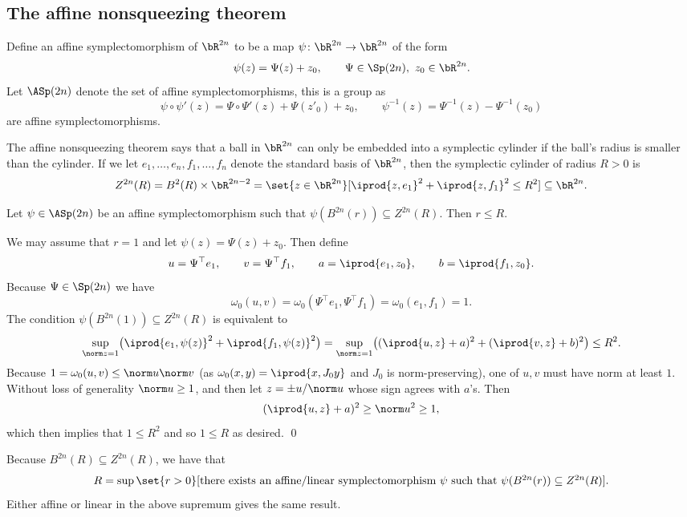 \subsection{The affine nonsqueezing theorem}

Define an {\emphcolor affine symplectomorphism} of $\bR^{2n}$ to be a map $\psi\colon\bR^{2n}\to\bR^{2n}$ of the form
$$ \psi(z) = \Psi(z) + z_0,\qquad \Psi\in\Sp(2n),\ z_0\in\bR^{2n} . $$
Let $\ASp(2n)$ denote the set of affine symplectomorphisms, this is a group as
$$ \psi\circ\psi'(z) = \Psi\circ\Psi'(z) + \Psi(z'_0) + z_0,\qquad \psi^{-1}(z) = \Psi^{-1}(z) - \Psi^{-1}(z_0) $$
are affine symplectomorphisms.

The affine nonsqueezing theorem says that a ball in $\bR^{2n}$ can only be embedded into a symplectic cylinder if the ball's radius is smaller than the cylinder.
If we let $e_1,\dots,e_n,f_1,\dots,f_n$ denote the standard basis of $\bR^{2n}$, then the symplectic cylinder of radius $R>0$ is
$$ Z^{2n}(R) = B^2(R) \times \bR^{2n-2} = \set{z\in\bR^{2n}}[\iprod{z,e_1}^2+\iprod{z,f_1}^2\leq R^2] \subseteq \bR^{2n} . $$

\bthrm[title={The affine nonsqueezing theorem}, name={affnonsqueeze}]

    Let $\psi\in\ASp(2n)$ be an affine symplectomorphism such that $\psi(B^{2n}(r))\subseteq Z^{2n}(R)$.
    Then $r\leq R$.

\ethrm

\bproof

    We may assume that $r=1$ and let $\psi(z)=\Psi(z)+z_0$.
    Then define
    $$ u = \Psi^\top e_1,\qquad v = \Psi^\top f_1,\qquad a = \iprod{e_1,z_0},\qquad b = \iprod{f_1,z_0} . $$
    Because $\Psi\in\Sp(2n)$ we have
    $$ \omega_0(u,v) = \omega_0(\Psi^\top e_1,\Psi^\top f_1) = \omega_0(e_1,f_1) = 1 . $$
    The condition $\psi(B^{2n}(1))\subseteq Z^{2n}(R)$ is equivalent to
    $$ \sup_{\norm z=1}\bigl(\iprod{e_1,\psi(z)}^2 + \iprod{f_1,\psi(z)}^2\bigr) = \sup_{\norm z=1}\bigl((\iprod{u,z}+a)^2 + (\iprod{v,z}+b)^2\bigr) \leq R^2 . $$
    Because $1=\omega_0(u,v)\leq\norm u\norm v$ (as $\omega_0(x,y)=\iprod{x,J_0y}$ and $J_0$ is norm-preserving), one of $u,v$ must have norm at least $1$.
    Without loss of generality $\norm u\geq1$, and then let $z=\pm u/\norm u$ whose sign agrees with $a$'s.
    Then
    $$ (\iprod{u,z} + a)^2 \geq \norm u^2 \geq 1 , $$
    which then implies that $1\leq R^2$ and so $1\leq R$ as desired.
    \qed

\eproof

Because $B^{2n}(R)\subseteq Z^{2n}(R)$, we have that
$$ R = \sup\set{r>0}[\hbox{there exists an affine/linear symplectomorphism $\psi$ such that $\psi(B^{2n}(r))\subseteq Z^{2n}(R)$}] . $$
Either affine or linear in the above supremum gives the same result.


